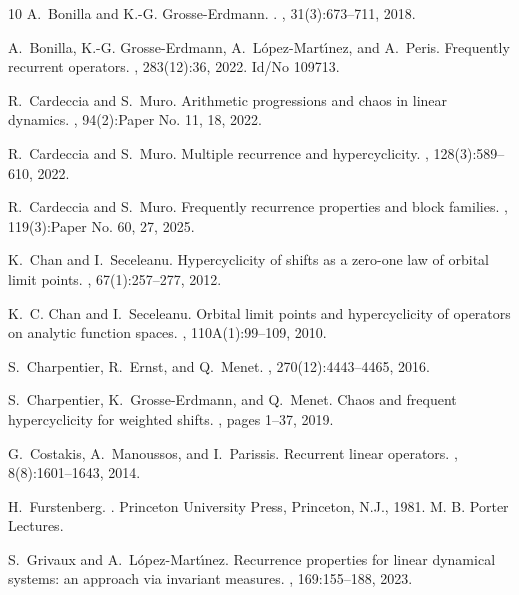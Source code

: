 \documentclass[11pt]{amsart}
\begin{document}
\begin{thebibliography}{10}
A.~{Bonilla} and K.-G. {Grosse-Erdmann}.
.
, 31(3):673--711, 2018.

A.~Bonilla, K.-G. Grosse-Erdmann, A.~L{\'o}pez-Mart{\'{\i}}nez, and A.~Peris.
\newblock Frequently recurrent operators.
, 283(12):36, 2022.
\newblock Id/No 109713.

R.~Cardeccia and S.~Muro.
\newblock Arithmetic progressions and chaos in linear dynamics.
, 94(2):Paper No. 11, 18, 2022.

R.~Cardeccia and S.~Muro.
\newblock Multiple recurrence and hypercyclicity.
, 128(3):589--610, 2022.

R.~Cardeccia and S.~Muro.
\newblock Frequently recurrence properties and block families.
,
  119(3):Paper No. 60, 27, 2025.

K.~Chan and I.~Seceleanu.
\newblock Hypercyclicity of shifts as a zero-one law of orbital limit points.
, 67(1):257--277, 2012.

K.~C. Chan and I.~Seceleanu.
\newblock Orbital limit points and hypercyclicity of operators on analytic
  function spaces.
, 110A(1):99--109, 2010.

S.~{Charpentier}, R.~{Ernst}, and Q.~{Menet}.
, 270(12):4443--4465, 2016.

S.~Charpentier, K.~Grosse-Erdmann, and Q.~Menet.
\newblock Chaos and frequent hypercyclicity for weighted shifts.
, pages 1--37, 2019.

G.~Costakis, A.~Manoussos, and I.~Parissis.
\newblock Recurrent linear operators.
, 8(8):1601--1643, 2014.

H.~Furstenberg.
.
\newblock Princeton University Press, Princeton, N.J., 1981.
\newblock M. B. Porter Lectures.

S.~Grivaux and A.~L\'{o}pez-Mart\'{\i}nez.
\newblock Recurrence properties for linear dynamical systems: an approach via
  invariant measures.
, 169:155--188, 2023.


\end{thebibliography}
\end{document}
